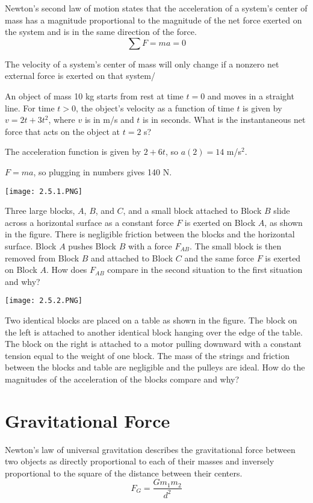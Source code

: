 \documentclass[../mech.tex]{subfiles}
\begin{document}
Newton's second law of motion states that the acceleration of a system's center of mass has a magnitude proportional to the magnitude of the net force exerted on the system and is in the same direction of the force.
\[ \sum F = ma =0 \]

The velocity of a system's center of mass will only change if a nonzero net external force is exerted on that system/

\begin{example}
    An object of mass 10 kg starts from rest at time $t=0$ and moves in a straight line. For time $t>0$, the object's velocity as a function of time $t$ is given by $v=2t+3t^2$, where $v$ is in m/s and $t$ is in seconds. What is the instantaneous net force that acts on the object at $t=2$ s?

    The acceleration function is given by $2+6t$, so $a(2)=14$ m/s$^2$.

    $F=ma$, so plugging in numbers gives 140 N.
\end{example}

\ex \begin{center}
    \texttt{[image: 2.5.1.PNG]}
\end{center}
Three large blocks, $A$, $B$, and $C$, and a small block attached to Block $B$ slide across a horizontal surface as a constant force $F$ is exerted on Block $A$, as shown in the figure.
There is negligible friction between the blocks and the horizontal surface. Block $A$ pushes Block $B$ with a force $F_{AB}$. The small block is then removed from Block $B$ and attached to Block $C$ and the same force $F$ 
is exerted on Block $A$. How does $F_{AB}$ compare in the second situation to the first situation and why?

\ex \begin{center}
    \texttt{[image: 2.5.2.PNG]}
\end{center}
Two identical blocks are placed on a table as shown in the figure. The block on the left is attached to another identical block hanging over the edge of the table. The block on the right is attached to a motor pulling downward 
with a constant tension equal to the weight of one block. The mass of the strings and friction between the blocks and table are negligible and the pulleys are ideal. How do the magnitudes of the acceleration of the blocks compare and why?

\section{Gravitational Force}
Newton's law of universal gravitation describes the gravitational force between two objects as directly proportional to each of their masses and inversely proportional to the square of the distance between their centers.
\[ F_G = \frac{Gm_1m_2}{d^2} \]
\end{document}

